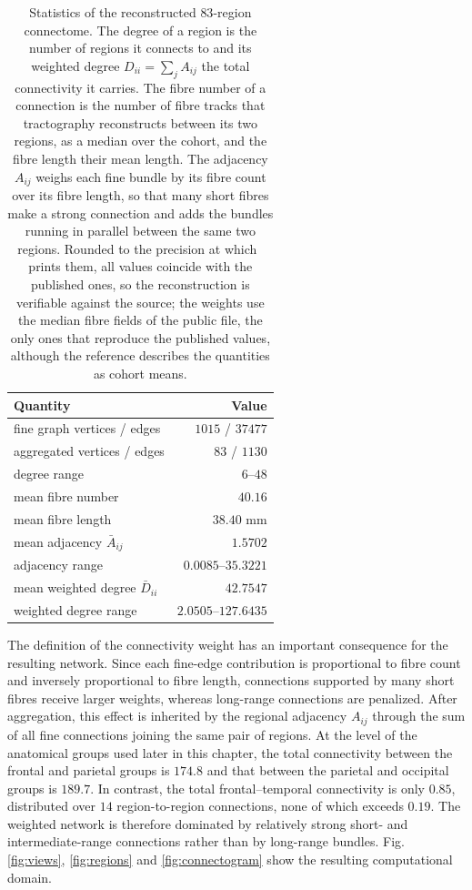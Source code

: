 \begin{table}[htbp]
\centering
\begin{tabular}{lr}
\hline
Quantity & Value \\
\hline
fine graph vertices / edges         & $1015$ / $37477$ \\
aggregated vertices / edges         & $83$ / $1130$ \\
degree range                        & $6$--$48$ \\
mean fibre number                   & $40.16$ \\
mean fibre length                   & $38.40$ mm \\
mean adjacency $\bar{A}_{ij}$       & $1.5702$ \\
adjacency range                     & $0.0085$--$35.3221$ \\
mean weighted degree $\bar{D}_{ii}$ & $42.7547$ \\
weighted degree range               & $2.0505$--$127.6435$ \\
\hline
\end{tabular}
\caption{ \footnotesize Statistics of the reconstructed $83$-region connectome. The degree of a region is the number of regions it connects to and its weighted degree $D_{ii}=\sum_{j} A_{ij}$ the total connectivity it carries. The fibre number of a connection is the number of fibre tracks that tractography reconstructs between its two regions, as a median over the cohort, and the fibre length their mean length. The adjacency $A_{ij}$ weighs each fine bundle by its
fibre count over its fibre length, so that many short fibres make a strong connection and adds the bundles running in parallel between the same two regions. Rounded to the precision at which~\cite{fornari2019prion} prints them, all values coincide with the published ones, so the reconstruction is verifiable against the source; the weights use the median fibre fields of the public file, the only ones that reproduce the published values, although the reference describes the quantities as cohort means.}
\label{tab:connectome}
\end{table}
\noindent
The definition of the connectivity weight has an important consequence for the resulting network. Since each fine-edge contribution is proportional to fibre count and inversely proportional to fibre length, connections supported by many short fibres receive larger weights, whereas long-range connections are penalized. After aggregation, this effect is inherited by the regional adjacency $A_{ij}$ through the sum of all fine connections joining the same pair of regions. At the level of the anatomical groups used later in this chapter, the total connectivity between the frontal and parietal groups is $174.8$ and that between the parietal and occipital groups is $189.7$. In contrast, the total frontal--temporal connectivity is only $0.85$, distributed over $14$ region-to-region connections, none of which exceeds $0.19$. The weighted network is therefore dominated by relatively strong short- and intermediate-range connections rather than by long-range bundles. Fig. \ref{fig:views}, \ref{fig:regions} and \ref{fig:connectogram} show the resulting computational domain.\\
